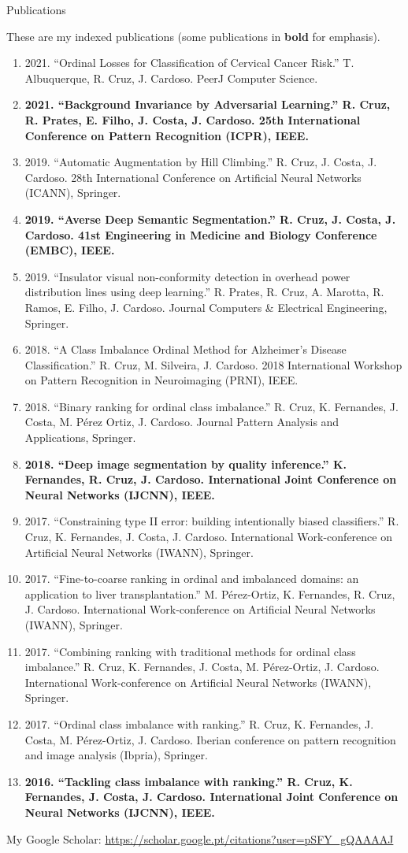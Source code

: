\documentclass[11pt]{article}
\begin{document}

\newpage
\centerline{\sc\large Publications}
These are my indexed publications (some publications in \textbf{bold} for emphasis).
\begin{enumerate}
\itemsep0em
\item 2021. ``Ordinal Losses for Classification of Cervical Cancer Risk.'' T. Albuquerque, R. Cruz, J. Cardoso. PeerJ Computer Science.\item \textbf{2021. ``Background Invariance by Adversarial Learning.'' R. Cruz, R. Prates, E. Filho, J. Costa, J. Cardoso. 25th International Conference on Pattern Recognition (ICPR), IEEE.}\item 2019. ``Automatic Augmentation by Hill Climbing.'' R. Cruz, J. Costa, J. Cardoso. 28th International Conference on Artificial Neural Networks (ICANN), Springer.\item \textbf{2019. ``Averse Deep Semantic Segmentation.'' R. Cruz, J. Costa, J. Cardoso. 41st Engineering in Medicine and Biology Conference (EMBC), IEEE.}\item 2019. ``Insulator visual non-conformity detection in overhead power distribution lines using deep learning.'' R. Prates, R. Cruz, A. Marotta, R. Ramos, E. Filho, J. Cardoso. Journal Computers \& Electrical Engineering, Springer.\item 2018. ``A Class Imbalance Ordinal Method for Alzheimer's Disease Classification.'' R. Cruz, M. Silveira, J. Cardoso. 2018 International Workshop on Pattern Recognition in Neuroimaging (PRNI), IEEE.\item 2018. ``Binary ranking for ordinal class imbalance.'' R. Cruz, K. Fernandes, J. Costa, M. Pérez Ortiz, J. Cardoso. Journal Pattern Analysis and Applications, Springer.\item \textbf{2018. ``Deep image segmentation by quality inference.'' K. Fernandes, R. Cruz, J. Cardoso. International Joint Conference on Neural Networks (IJCNN), IEEE.}\item 2017. ``Constraining type II error: building intentionally biased classifiers.'' R. Cruz, K. Fernandes, J. Costa, J. Cardoso. International Work-conference on Artificial Neural Networks (IWANN), Springer.\item 2017. ``Fine-to-coarse ranking in ordinal and imbalanced domains: an application to liver transplantation.'' M. Pérez-Ortiz, K. Fernandes, R. Cruz, J. Cardoso. International Work-conference on Artificial Neural Networks (IWANN), Springer.\item 2017. ``Combining ranking with traditional methods for ordinal class imbalance.'' R. Cruz, K. Fernandes, J. Costa, M. Pérez-Ortiz, J. Cardoso. International Work-conference on Artificial Neural Networks (IWANN), Springer.\item 2017. ``Ordinal class imbalance with ranking.'' R. Cruz, K. Fernandes, J. Costa, M. Pérez-Ortiz, J. Cardoso. Iberian conference on pattern recognition and image analysis (Ibpria), Springer.\item \textbf{2016. ``Tackling class imbalance with ranking.'' R. Cruz, K. Fernandes, J. Costa, J. Cardoso. International Joint Conference on Neural Networks (IJCNN), IEEE.}\end{enumerate}
My Google Scholar: \url{https://scholar.google.pt/citations?user=pSFY_gQAAAAJ}
\end{document}
